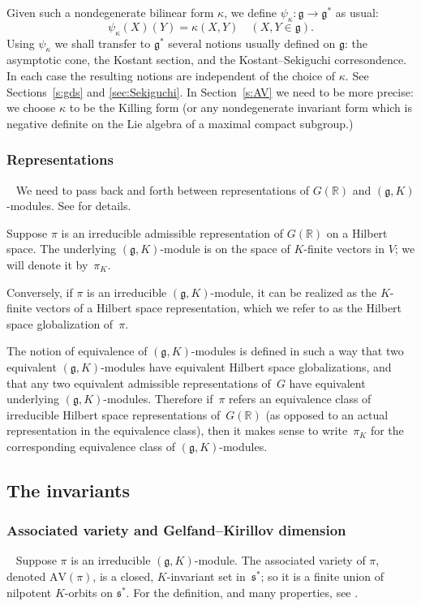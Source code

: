\documentclass[cupthm]{CUP-JNL-JMJ}
\numberwithin{equation}{section}
\theoremstyle{cupplain}
\theoremstyle{cupdefinition}
\theoremstyle{cupremark}
\theoremstyle{cupproof}
\newcommand{\R}{\mathbb R}
\newcommand{\g}{\mathfrak g}
\newcommand{\s}{\mathfrak s}
\newcommand{\AV}{\mathrm{AV}}
\begin{document}
Given such a nondegenerate bilinear form $\kappa$, we define
$\psi_\kappa: \g\rightarrow \g^*$ as usual:
$$
\psi_\kappa(X)(Y)=\kappa(X,Y)\quad (X,Y\in\g).
$$
Using $\psi_\kappa$ we shall transfer to $\g^\ast$ several notions usually defined on $\g$: the asymptotic cone, the Kostant section, and the Kostant--Sekiguchi corresondence. In each case the resulting notions are independent of the
choice of $\kappa$. See Sections~\ref{s:gds} and \ref{sec:Sekiguchi}.
In Section~\ref{s:AV} we need to be more precise: we choose  $\kappa$ to be the Killing form  (or any nondegenerate
invariant form which is negative definite on the Lie algebra of a maximal compact subgroup.)

\subsubsection{Representations}~
We need to pass back and forth between representations of $G(\R)$ and $(\g,K)$-modules.
See \cite[Chapter~0]{greenbook} for details.

Suppose $\pi$ is an irreducible admissible representation of $G(\R)$  on a Hilbert space. 
The underlying
$(\g,K)$-module is on the space of $K$-finite vectors in
$V$; we will denote it by~$\pi_K$. 

Conversely, if $\pi$ is an irreducible $(\g,K)$-module, it can be
realized as the $K$-finite vectors of a Hilbert space representation, which we
refer to as the Hilbert space globalization of~$\pi$.

The notion of equivalence of $(\g, K)$-modules is defined in such a way that two equivalent $(\g, K)$-modules have equivalent Hilbert space globalizations, and that any two equivalent admissible representations of~$G$ have equivalent underlying $(\g, K)$-modules. Therefore if~$\pi$ refers an equivalence class of irreducible Hilbert space representations of~$G(\R)$ (as opposed to an actual representation in the equivalence class), then it makes sense to write~$\pi_K$ for the corresponding equivalence class of $(\g, K)$-modules.

\subsection{The invariants}\label{sec:invariants}


\subsubsection{Associated variety and Gelfand--Kirillov dimension}~
Suppose $\pi$ is an irreducible $(\g,K)$-module.
The associated variety of $\pi$, denoted $\AV(\pi)$, is a closed, $K$-invariant set in~$\s^*$; so it is a finite union of
nilpotent $K$-orbits on $\s^*$. For the definition, and many properties, see \cite[Section 5]{vogan_bowdoin}. 
\end{document}
